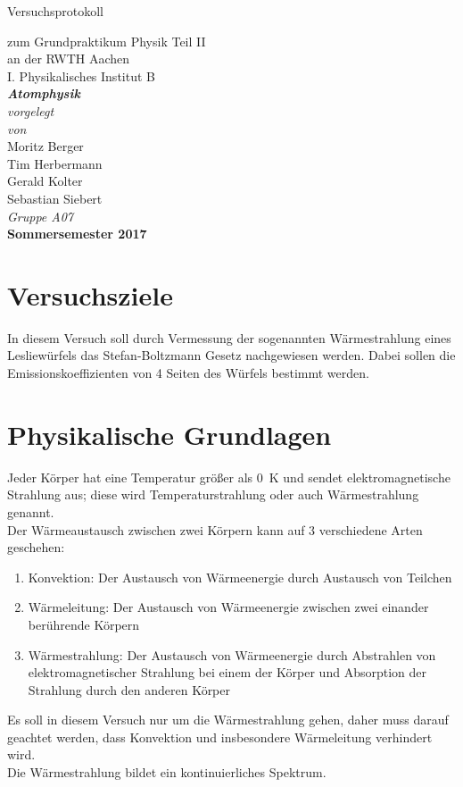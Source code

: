 \documentclass[12pt,a4paper]{article}
\author{Tim}
\begin{document}
	\setlength{\parindent}{0pt} 
	\begin{center}
		{\LARGE Versuchsprotokoll}\\
		\begin{large}
			zum Grundpraktikum Physik Teil II\\[0.4cm]
			an der RWTH Aachen\\
			I. Physikalisches Institut B\\[4.5cm]
			\Large\textbf{\textsl{Atomphysik}}\\[4cm]
			\normalsize\textit{vorgelegt\\von}\\[0.4cm]
			\large{Moritz Berger\\Tim Herbermann\\Gerald Kolter\\Sebastian Siebert}\\[1cm]
			\large \textit{Gruppe A07} \\ [3cm]
			\large \textbf{Sommersemester 2017}
		\end{large}
	\end{center}
	\newpage
	
\tableofcontents
\newpage

\section{Versuchsziele}
In diesem Versuch soll durch Vermessung der sogenannten Wärmestrahlung eines Lesliewürfels das Stefan-Boltzmann Gesetz nachgewiesen werden. Dabei sollen die Emissionskoeffizienten von 4 Seiten des Würfels bestimmt werden.

\section{Physikalische Grundlagen}
Jeder Körper hat eine Temperatur größer als \SI{0}{K} und sendet elektromagnetische Strahlung aus; diese wird Temperaturstrahlung oder auch Wärmestrahlung genannt. \\
Der Wärmeaustausch zwischen zwei Körpern kann auf 3 verschiedene Arten geschehen:
\begin{enumerate}
\item Konvektion: Der Austausch von Wärmeenergie durch Austausch von Teilchen
\item Wärmeleitung: Der Austausch von Wärmeenergie zwischen zwei einander berührende Körpern
\item Wärmestrahlung: Der Austausch von Wärmeenergie durch Abstrahlen von elektromagnetischer Strahlung bei einem der Körper und Absorption der Strahlung durch den anderen Körper
\end{enumerate}
Es soll in diesem Versuch nur um die Wärmestrahlung gehen, daher muss darauf geachtet werden, dass Konvektion und insbesondere Wärmeleitung verhindert wird. \\
Die Wärmestrahlung bildet ein kontinuierliches Spektrum. 
\end{document}
